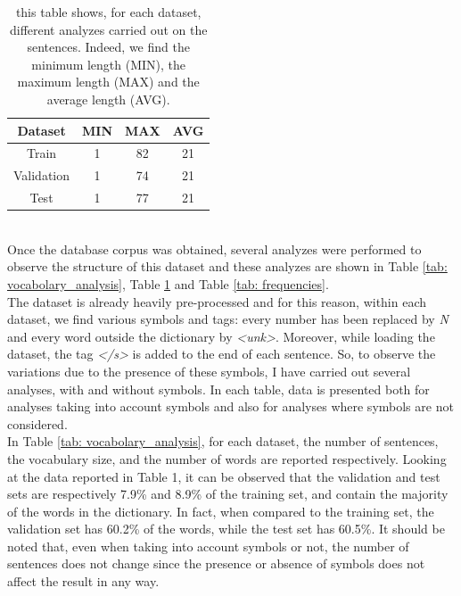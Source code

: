 \documentclass[a4paper]{article}
\begin{document}
\begin{table}[t]
        \centering
        \begin{tabular}{|c|c|c|c|}
            \hline
            Dataset & MIN & MAX & AVG\\
            \hline
            Train & 1 & 82 & 21\\
            \hline
            Validation & 1 & 74 & 21\\
            \hline
            Test & 1 & 77 & 21\\
            \hline
        \end{tabular}
        \caption{this table shows, for each dataset, different analyzes carried out on the sentences. Indeed, we find the minimum length (MIN), the maximum length (MAX) and the average length (AVG).}
        \label{tab: sentences_analysis}
\end{table}
\\
Once the database corpus was obtained, several analyzes were performed to observe the structure of this dataset and these analyzes are shown in Table \ref{tab: vocabolary_analysis}, Table \ref{tab: sentences_analysis} and Table \ref{tab: frequencies}.
\\
The dataset is already heavily pre-processed and for this reason, within each dataset, we find various symbols and tags: every number has been replaced by \textit{N} and every word outside the dictionary by \textit{\textless unk\textgreater}. Moreover, while loading the dataset, the tag \textit{\textless /s\textgreater} is added to the end of each sentence.
So, to observe the variations due to the presence of these symbols, I have carried out several analyses, with and without symbols. In each table, data is presented both for analyses taking into account symbols and also for analyses where symbols are not considered.
\\
In Table \ref{tab: vocabolary_analysis}, for each dataset, the number of sentences, the vocabulary size, and the number of words are reported respectively. Looking at the data reported in Table 1, it can be observed that the validation and test sets are respectively 7.9\% and 8.9\% of the training set, and contain the majority of the words in the dictionary. In fact, when compared to the training set, the validation set has 60.2\% of the words, while the test set has 60.5\%. It should be noted that, even when taking into account symbols or not, the number of sentences does not change since the presence or absence of symbols does not affect the result in any way.
\\
\end{document}
